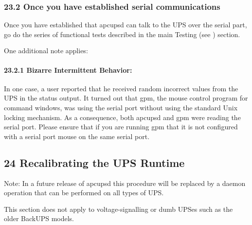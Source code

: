 {{{{{{{{{{\label{Once-you-have-established-serial-communications}

\subsubsection*{23.2 Once you have established serial communications}

\label{index-Testing-230}
Once you have established that apcupsd can talk to the UPS over the serial
part, go do the series of functional tests described in the main Testing (see 
) section.  

One additional note applies: 

\label{Bizarre-Intermittent-Behavior}

\paragraph*{23.2.1 Bizarre Intermittent Behavior:}

In one case, a user reported that he received random incorrect values from the
UPS in the status output. It turned out that gpm, the mouse control program
for command windows, was using the serial port without using the standard Unix
locking mechanism. As a consequence, both apcupsd and gpm were reading the
serial port. Please ensure that if you are running gpm that it is not
configured with a serial port mouse on the same serial port. 

\label{Recalibrating-the-UPS-Runtime}

\subsection*{24 Recalibrating the UPS Runtime}

\label{index-Runtime-recalibration-231}
\label{index-Recalibration-Runtime-232}
Note: In a future release of apcupsd this procedure will be replaced by a
daemon operation that can be performed on all types of UPS.  

This section does not apply to voltage-signalling or dumb UPSes such as the
older BackUPS models.  

}}}}}}}}}}
